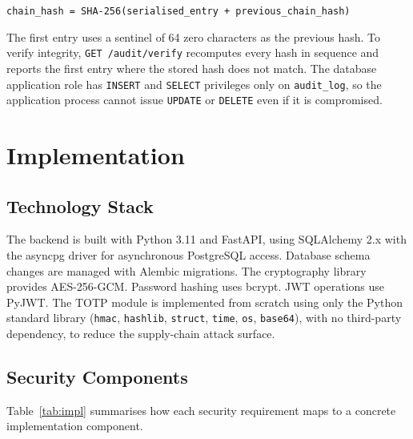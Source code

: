 \documentclass[11pt,a4paper]{article}
\begin{document}
\begin{center}
\small\texttt{chain\_hash = SHA-256(serialised\_entry + previous\_chain\_hash)}
\end{center}

The first entry uses a sentinel of 64 zero characters as the previous hash.
To verify integrity, \texttt{GET /audit/verify} recomputes every hash in
sequence and reports the first entry where the stored hash does not match.
The database application role has \texttt{INSERT} and \texttt{SELECT}
privileges only on \texttt{audit\_log}, so the application process cannot
issue \texttt{UPDATE} or \texttt{DELETE} even if it is compromised.

\section{Implementation}

\subsection{Technology Stack}

The backend is built with Python 3.11 and FastAPI, using SQLAlchemy 2.x
with the asyncpg driver for asynchronous PostgreSQL access. Database schema
changes are managed with Alembic migrations. The cryptography library
provides AES-256-GCM. Password hashing uses bcrypt. JWT operations use
PyJWT. The TOTP module is implemented from scratch using only the Python
standard library (\texttt{hmac}, \texttt{hashlib}, \texttt{struct},
\texttt{time}, \texttt{os}, \texttt{base64}), with no third-party
dependency, to reduce the supply-chain attack surface.

\subsection{Security Components}

Table~\ref{tab:impl} summarises how each security requirement maps to a
concrete implementation component.
\end{document}
